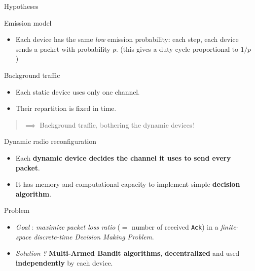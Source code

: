 \documentclass[12pt,english,ignorenonframetext,]{beamer}
\providecommand{\tightlist}{%
  \setlength{\itemsep}{0pt}\setlength{\parskip}{0pt}}
\begin{document}
\begin{frame}{Hypotheses}

\begin{block}{Emission model}

\begin{itemize}
\tightlist
\item
  Each device has the same \emph{low} emission probability: \newline
   each step, each device sends a packet with probability \(p\).
  \newline
   \hfill{}\small{(this gives a duty cycle proportional to $1/p$)}
\end{itemize}

\end{block}

\begin{block}{Background traffic}

\begin{itemize}
\tightlist
\item
  Each static device uses only one channel.
\item
  Their repartition is fixed in time.
\end{itemize}

\begin{quote}
\(\implies\) Background traffic, bothering the dynamic devices!
\end{quote}

\end{block}

\begin{block}{Dynamic radio reconfiguration}

\begin{itemize}
\tightlist
\item
  Each \textbf{dynamic device decides the channel it uses to send every
  packet}.
\item
  It has memory and computational capacity to implement simple
  \textbf{decision algorithm}.
\end{itemize}

\end{block}

\begin{block}{Problem}

\begin{itemize}
\tightlist
\item
  \emph{Goal} : \emph{maximize packet loss ratio} (\(=\) number of
  received \texttt{Ack}) in a \emph{finite-space discrete-time Decision
  Making Problem}.
\item
  \emph{Solution ?} \textbf{Multi-Armed Bandit algorithms},
  \textbf{decentralized} and used \textbf{independently} by each device.
\end{itemize}

\end{block}

\end{frame}
\end{document}
